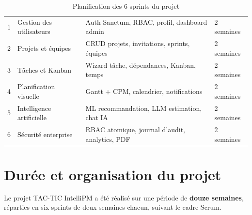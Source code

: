 \begin{table}[H]
  \centering
  \caption{Planification des 6 sprints du projet}
  \label{tab:sprints_planning}
  \begin{tabularx}{\textwidth}{C{1.5cm}L{4cm}X L{2.5cm}}
    \toprule
     &  &  &  \\
    \midrule
    1 & Gestion des utilisateurs  & Auth Sanctum, RBAC, profil, dashboard admin         & 2 semaines \\
    2 & Projets et équipes        & CRUD projets, invitations, sprints, équipes         & 2 semaines \\
    3 & Tâches et Kanban          & Wizard tâche, dépendances, Kanban, temps            & 2 semaines \\
    4 & Planification visuelle    & Gantt + CPM, calendrier, notifications              & 2 semaines \\
    5 & Intelligence artificielle & ML recommandation, LLM estimation, chat IA          & 2 semaines \\
    6 & Sécurité enterprise       & RBAC atomique, journal d'audit, analytics, PDF      & 2 semaines \\
    \bottomrule
  \end{tabularx}
\end{table}

\section{Durée et organisation du projet}

Le projet TAC-TIC IntelliPM a été réalisé sur une période de \textbf{douze semaines},
réparties en six sprints de deux semaines chacun, suivant le cadre Scrum.

